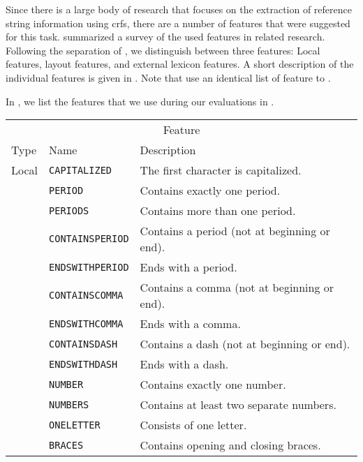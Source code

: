 Since there is a large body of research that focuses on the extraction of reference string information using \glspl{crf}, there are a number of features that were suggested for this task.
 summarized a survey of the used features in related research.
Following the separation of \citet{peng2004accurate}, we distinguish between three features:
Local features, layout features, and external lexicon features.
A short description of the individual features is given in .
Note that \citet{wu2014citeseerx} use an identical list of feature to \citet{councill2008parscit}.

\bigskip

In , we list the features that we use during our evaluations in .
\begin{table}[t]
\centering
\begin{tabular}{l l l}
  \toprule
  \multicolumn{3}{c}{Feature}\\
  Type    & Name            & Description\\
  \midrule
  Local   & \texttt{CAPITALIZED}     & The first character is capitalized.\\
          & \texttt{PERIOD}          & Contains exactly one period.\\
          & \texttt{PERIODS}         & Contains more than one period.\\
          & \texttt{CONTAINSPERIOD}  & Contains a period (not at beginning or end).\\
          & \texttt{ENDSWITHPERIOD}  & Ends with a period.\\
          & \texttt{CONTAINSCOMMA}   & Contains a comma (not at beginning or end).\\
          & \texttt{ENDSWITHCOMMA}   & Ends with a comma.\\
          & \texttt{CONTAINSDASH}    & Contains a dash (not at beginning or end).\\
          & \texttt{ENDSWITHDASH}    & Ends with a dash.\\
          & \texttt{NUMBER}          & Contains exactly one number.\\
          & \texttt{NUMBERS}         & Contains at least two separate numbers.\\
          & \texttt{ONELETTER}       & Consists of one letter.\\
          & \texttt{BRACES}          & Contains opening and closing braces.\\

\end{tabular}
\end{table}
